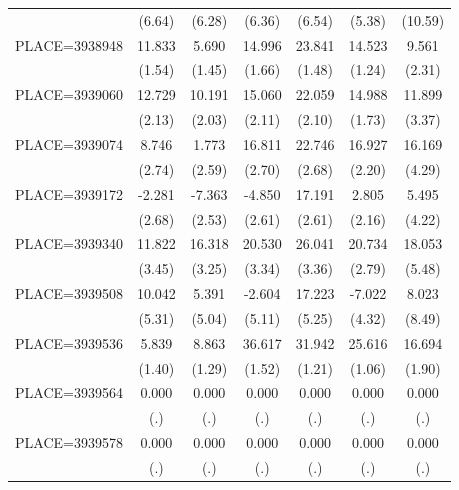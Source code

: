 {\begin{tabular}{l*{6}{c}}
                    &      (6.64)&      (6.28)&      (6.36)&      (6.54)&      (5.38)&     (10.59)\\
PLACE=3938948       &      11.833&       5.690&      14.996&      23.841&      14.523&       9.561\\
                    &      (1.54)&      (1.45)&      (1.66)&      (1.48)&      (1.24)&      (2.31)\\
PLACE=3939060       &      12.729&      10.191&      15.060&      22.059&      14.988&      11.899\\
                    &      (2.13)&      (2.03)&      (2.11)&      (2.10)&      (1.73)&      (3.37)\\
PLACE=3939074       &       8.746&       1.773&      16.811&      22.746&      16.927&      16.169\\
                    &      (2.74)&      (2.59)&      (2.70)&      (2.68)&      (2.20)&      (4.29)\\
PLACE=3939172       &      -2.281&      -7.363&      -4.850&      17.191&       2.805&       5.495\\
                    &      (2.68)&      (2.53)&      (2.61)&      (2.61)&      (2.16)&      (4.22)\\
PLACE=3939340       &      11.822&      16.318&      20.530&      26.041&      20.734&      18.053\\
                    &      (3.45)&      (3.25)&      (3.34)&      (3.36)&      (2.79)&      (5.48)\\
PLACE=3939508       &      10.042&       5.391&      -2.604&      17.223&      -7.022&       8.023\\
                    &      (5.31)&      (5.04)&      (5.11)&      (5.25)&      (4.32)&      (8.49)\\
PLACE=3939536       &       5.839&       8.863&      36.617&      31.942&      25.616&      16.694\\
                    &      (1.40)&      (1.29)&      (1.52)&      (1.21)&      (1.06)&      (1.90)\\
PLACE=3939564       &       0.000&       0.000&       0.000&       0.000&       0.000&       0.000\\
                    &         (.)&         (.)&         (.)&         (.)&         (.)&         (.)\\
PLACE=3939578       &       0.000&       0.000&       0.000&       0.000&       0.000&       0.000\\
                    &         (.)&         (.)&         (.)&         (.)&         (.)&         (.)\\

\end{tabular}}
